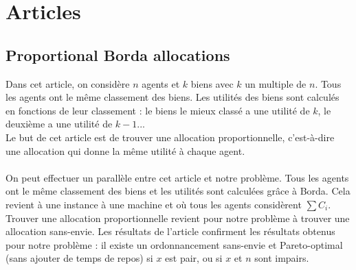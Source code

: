 \documentclass[12pt]{article}
\theoremstyle{definition}
\begin{document}
\section{Articles}
\subsection{Proportional Borda allocations}
Dans cet article, on considère $n$ agents et $k$ biens avec $k$ un multiple de $n$. Tous les agents ont le même classement des biens. Les utilités des biens sont calculés en fonctions de leur classement : le biens le mieux classé a une utilité de $k$, le deuxième a une utilité de $k-1$...\\
Le but de cet article est de trouver une allocation proportionnelle, c'est-à-dire une allocation qui donne la même utilité à chaque agent.\\\\
On peut effectuer un parallèle entre cet article et notre problème. Tous les agents ont le même classement des biens et les utilités sont calculées grâce à Borda. Cela revient à une instance à une machine et où tous les agents considèrent $\sum C_i$. Trouver une allocation proportionnelle revient pour notre problème à trouver une allocation sans-envie. Les résultats de l'article confirment les résultats obtenus pour notre problème : il existe un ordonnancement sans-envie et Pareto-optimal (sans ajouter de temps de repos) si $x$ est pair, ou si $x$ et $n$ sont impairs.
\newpage


\end{document}
